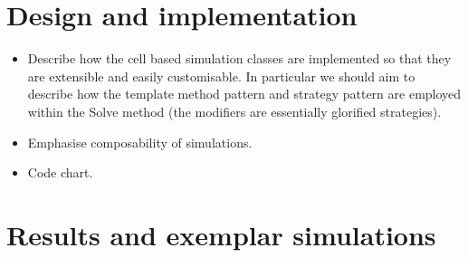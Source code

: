 \documentclass[superscriptaddress, a4paper]{article}
\begin{document}
\section{Design and implementation}
\label{sec:design and implementation}

\begin{itemize}
 \item Describe how the cell based simulation classes are implemented so that they are extensible and easily customisable. In particular we should aim to describe how the template method pattern and strategy pattern are employed within the Solve method (the modifiers are essentially glorified strategies).
 \item Emphasise composability of simulations. 
  \item Code chart.
\end{itemize}

\section{Results and exemplar simulations}
\label{sec:results}
\end{document}
